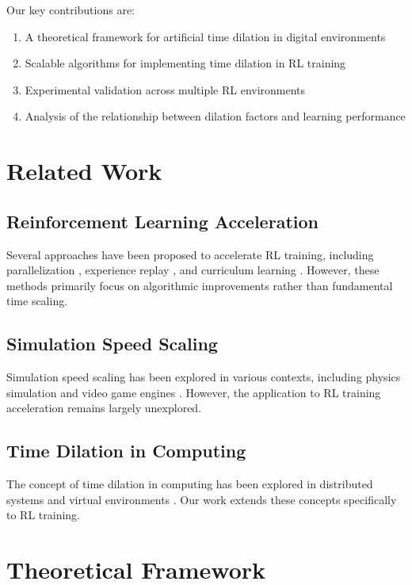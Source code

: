 \documentclass[11pt,twocolumn]{article}
\begin{document}
Our key contributions are:
\begin{enumerate}
    \item A theoretical framework for artificial time dilation in digital environments
    \item Scalable algorithms for implementing time dilation in RL training
    \item Experimental validation across multiple RL environments
    \item Analysis of the relationship between dilation factors and learning performance
\end{enumerate}

\section{Related Work}

\subsection{Reinforcement Learning Acceleration}

Several approaches have been proposed to accelerate RL training, including parallelization \cite{mnih2016asynchronous}, experience replay \cite{lin1992self}, and curriculum learning \cite{bengio2009curriculum}. However, these methods primarily focus on algorithmic improvements rather than fundamental time scaling.

\subsection{Simulation Speed Scaling}

Simulation speed scaling has been explored in various contexts, including physics simulation \cite{erleben2018physics} and video game engines \cite{gregory2018game}. However, the application to RL training acceleration remains largely unexplored.

\subsection{Time Dilation in Computing}

The concept of time dilation in computing has been explored in distributed systems \cite{lamport1978time} and virtual environments \cite{steed2009time}. Our work extends these concepts specifically to RL training.

\section{Theoretical Framework}
\end{document}
